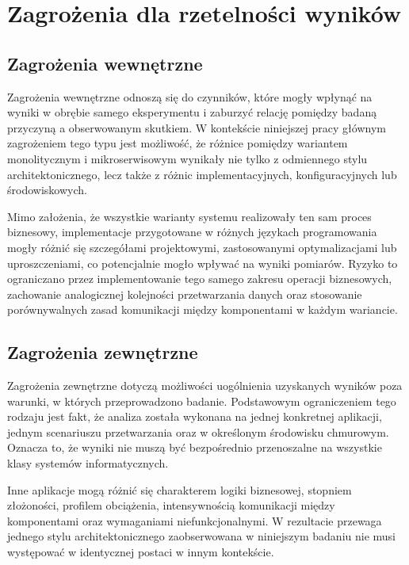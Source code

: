 \chapter{Zagrożenia dla rzetelności wyników}
\label{chapter:dangers}

\section{Zagrożenia wewnętrzne}

Zagrożenia wewnętrzne odnoszą się do czynników, które mogły wpłynąć na wyniki w obrębie samego eksperymentu i zaburzyć relację pomiędzy badaną przyczyną a obserwowanym skutkiem. W kontekście niniejszej pracy głównym zagrożeniem tego typu jest możliwość, że różnice pomiędzy wariantem monolitycznym i mikroserwisowym wynikały nie tylko z odmiennego stylu architektonicznego, lecz także z różnic implementacyjnych, konfiguracyjnych lub środowiskowych.

Mimo założenia, że wszystkie warianty systemu realizowały ten sam proces biznesowy, implementacje przygotowane w różnych językach programowania mogły różnić się szczegółami projektowymi, zastosowanymi optymalizacjami lub uproszczeniami, co potencjalnie mogło wpływać na wyniki pomiarów. Ryzyko to ograniczano przez implementowanie tego samego zakresu operacji biznesowych, zachowanie analogicznej kolejności przetwarzania danych oraz stosowanie porównywalnych zasad komunikacji między komponentami w każdym wariancie.

\section{Zagrożenia zewnętrzne}

Zagrożenia zewnętrzne dotyczą możliwości uogólnienia uzyskanych wyników poza warunki, w których przeprowadzono badanie. Podstawowym ograniczeniem tego rodzaju jest fakt, że analiza została wykonana na jednej konkretnej aplikacji, jednym scenariuszu przetwarzania oraz w określonym środowisku chmurowym. Oznacza to, że wyniki nie muszą być bezpośrednio przenoszalne na wszystkie klasy systemów informatycznych.

Inne aplikacje mogą różnić się charakterem logiki biznesowej, stopniem złożoności, profilem obciążenia, intensywnością komunikacji między komponentami oraz wymaganiami niefunkcjonalnymi. W rezultacie przewaga jednego stylu architektonicznego zaobserwowana w niniejszym badaniu nie musi występować w identycznej postaci w innym kontekście.

